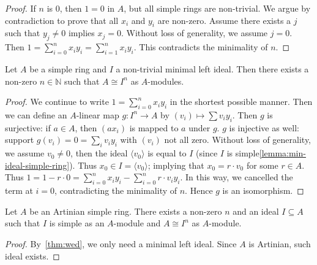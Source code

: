 \begin{proof}
  If $n$ is $0$, then $1 = 0$ in $A$, but all simple rings are non-trivial. We
  argue by contradiction to prove that all $x_{i}$ and $y_{i}$ are non-zero.
  Assume there exists a $j$ such that $y_{j}\ne0$ implies $x_{j} = 0$. Without
  loss of generality, we assume $j = 0$. Then
  $1 = \sum_{i=0}^{n}x_{i}y_{i}=\sum_{i=1}^{n}x_{i}y_{i}$. This contradicts the
  minimality of $n$.
\end{proof}

\begin{theorem}[Wedderburn]\label{thm:wed}
  Let $A$ be a simple ring and $I$ a non-trivial minimal left ideal. Then there
  exists a non-zero $n \in \mathbb{N}$ such that $A \cong I^{n}$ as $A$-modules.
  \leanok
\end{theorem}

\begin{proof}
  We continue to write $1 = \sum_{i=0}^{n}x_{i}y_{i}$ in the shortest possible
  manner. Then we can define an $A$-linear map $g : I^{n}\to A$ by
  $(v_{i})\mapsto \sum v_{i}y_{i}$. Then $g$ is surjective: if $a \in A$, then
  $(ax_{i})$ is mapped to $a$ under $g$. $g$ is injective as well: support
  $g(v_{i})=0=\sum_{i}v_{i}y_{i}$ with $(v_{i})$ not all zero. Without loss of
  generality, we assume $v_{0} \ne 0$, then the ideal $\langle v_{0}\rangle$ is
  equal to $I$ (since $I$ is simple\cref{lemma:min-ideal-simple-ring}). Thus
  $x_{0}\in I = \langle v_{0}\rangle$; implying that $x_{0}=r\cdot v_{0}$ for
  some $r\in A$. Thus
  $1=1 - r\cdot 0 = \sum_{i=0}^{n}x_{i}y_{i}-\sum_{i=0}^{n}r\cdot v_{i}y_{i}$.
  In this way, we cancelled the term at $i=0$, contradicting the minimality of
  $n$. Hence $g$ is an isomorphism.
\end{proof}

\begin{theorem}
  Let $A$ be an Artinian simple ring. There exists a non-zero $n$ and an ideal
  $I \subseteq A$ such that $I$ is simple as an $A$-module and $A \cong I^{n}$
  as $A$-module.
  \label{thm:wed-artin-ideal}
  \leanok
\end{theorem}

\begin{proof}
  By~\cref{thm:wed}, we only need a minimal left ideal. Since $A$ is Artinian,
  such ideal exists.
\end{proof}

